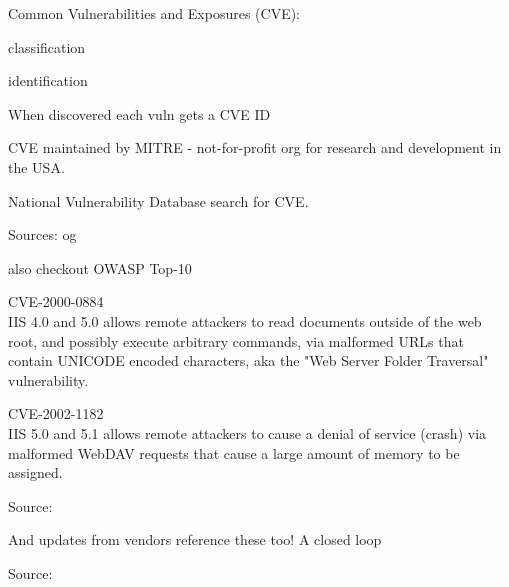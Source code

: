 \documentclass[Screen16to9,17pt]{foils}
\begin{document}
\begin{list1}
\item Common Vulnerabilities and Exposures (CVE):
  \begin{list2}
  \item classification
  \item identification
  \end{list2}
\item When discovered each vuln gets a CVE ID
\item CVE maintained by MITRE - not-for-profit
org for research and development in the USA.
\item National Vulnerability Database search for CVE.
\item Sources:  og 
\item also checkout OWASP Top-10 
\end{list1}


\begin{list1}
\item \small CVE-2000-0884\\
IIS 4.0 and 5.0 allows remote attackers to read documents outside of
the web root, and possibly execute arbitrary commands, via malformed
URLs that contain UNICODE encoded characters, aka the "Web Server
Folder Traversal" vulnerability.

\item \small CVE-2002-1182\\
IIS 5.0 and 5.1 allows remote attackers to cause a denial of service
(crash) via malformed WebDAV requests that cause a large amount of
memory to be assigned.

\item Source:\\
\end{list1}

\centerline{And updates from vendors reference these too! A closed loop}





Source:
\end{document}
